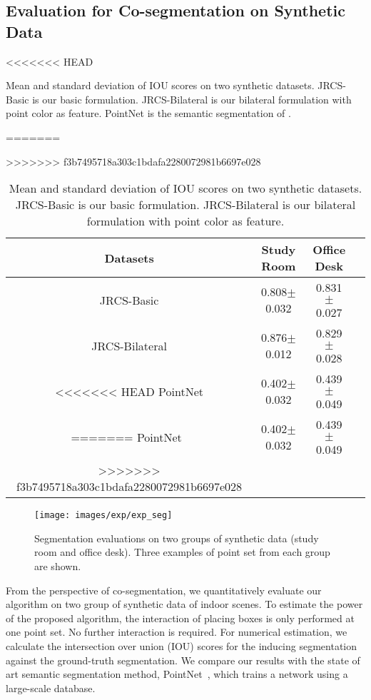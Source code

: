 \subsection{Evaluation for Co-segmentation on Synthetic Data}
\begin{table}
	\centering
<<<<<<< HEAD
	\caption{Mean and standard deviation of IOU scores on two synthetic datasets. JRCS-Basic is our basic formulation. JRCS-Bilateral  is our bilateral formulation with point color as feature. PointNet is the semantic segmentation of \cite{qi2016pointnet}. }
=======
	\caption{Mean and standard deviation of IOU scores on two synthetic datasets. JRCS-Basic is our basic formulation. JRCS-Bilateral  is our bilateral formulation with point color as feature.  }
>>>>>>> f3b7495718a303c1bdafa2280072981b6697e028
	\begin{tabular}{c c c c}
		Datasets &  Study Room & Office Desk \\
		\hline
		JRCS-Basic & 0.808$\pm$0.032 & 0.831 $\pm$ 0.027\\   
		JRCS-Bilateral & 0.876$\pm$0.012 & 0.829 $\pm$ 0.028\\
<<<<<<< HEAD
		PointNet & 0.402$\pm$0.032 &  0.439 $\pm$ 0.049\\
=======
		PointNet~\cite{qi2016pointnet} & 0.402$\pm$0.032 &  0.439 $\pm$ 0.049\\
>>>>>>> f3b7495718a303c1bdafa2280072981b6697e028
	\end{tabular}
	\label{tab:seg}
\end{table}
\begin{figure}[htb]
	\centering
	\texttt{[image: images/exp/exp\_seg]}
	\caption{\label{fig:seg} Segmentation evaluations on two groups of synthetic data (study room and office desk). Three examples of point set from each group are shown.}
\end{figure}
%
From the perspective of co-segmentation, we quantitatively evaluate our algorithm on two group of synthetic data of indoor scenes. 
%
To estimate the power of the proposed algorithm, the interaction of placing boxes is only performed at one point set. No further interaction is required. 
%
For numerical estimation, we calculate the intersection over union (IOU) scores for the inducing segmentation against the ground-truth segmentation.
% 
We compare our results with the state of art semantic segmentation method, PointNet~\cite{qi2016pointnet}, which trains a network using a large-scale database. 
